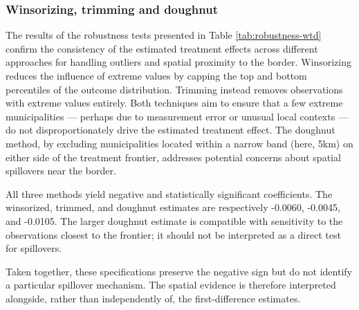 \subsubsection{Winsorizing, trimming and doughnut}

The results of the robustness tests presented in Table \ref{tab:robustness-wtd} confirm the consistency of the estimated treatment effects across different approaches for handling outliers and spatial proximity to the border. Winsorizing reduces the influence of extreme values by capping the top and bottom percentiles of the outcome distribution. Trimming instead removes observations with extreme values entirely. Both techniques aim to ensure that a few extreme municipalities — perhaps due to measurement error or unusual local contexts — do not disproportionately drive the estimated treatment effect. The doughnut method, by excluding municipalities located within a narrow band (here, 5km) on either side of the treatment frontier, addresses potential concerns about spatial spillovers near the border.

All three methods yield negative and statistically significant coefficients. The winsorized, trimmed, and doughnut estimates are respectively -0.0060, -0.0045, and -0.0105. The larger doughnut estimate is compatible with sensitivity to the observations closest to the frontier; it should not be interpreted as a direct test for spillovers.

Taken together, these specifications preserve the negative sign but do not identify a particular spillover mechanism. The spatial evidence is therefore interpreted alongside, rather than independently of, the first-difference estimates.


